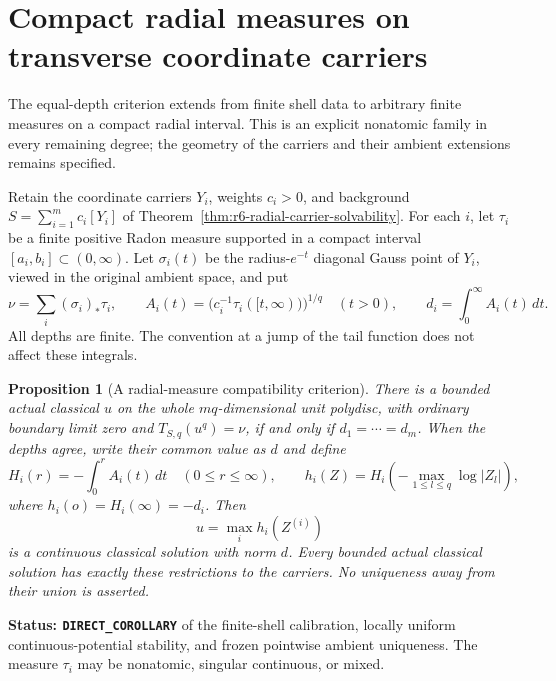 \documentclass[11pt,a4paper]{article}
\numberwithin{equation}{section}
\newtheorem{proposition}[theorem]{Proposition}
\theoremstyle{definition}
\theoremstyle{remark}
\begin{document}
\section{Compact radial measures on transverse coordinate carriers}
\label{sec:r6-radial-measure-carriers}

The equal-depth criterion extends from finite shell data to arbitrary
finite measures on a compact radial interval. This is an explicit
nonatomic family in every remaining degree; the geometry of the
carriers and their ambient extensions remains specified.

Retain the coordinate carriers $Y_i$, weights $c_i>0$, and background
$S=\sum_{i=1}^m c_i[Y_i]$ of
Theorem~\ref{thm:r6-radial-carrier-solvability}. For each $i$, let
$\tau_i$ be a finite positive Radon measure supported in a compact
interval $[a_i,b_i]\subset(0,\infty)$. Let
$\sigma_i(t)$ be the radius-$e^{-t}$ diagonal Gauss point of $Y_i$,
viewed in the original ambient space, and put
\[
 \nu=\sum_i(\sigma_i)_*\tau_i,\qquad
 A_i(t)=\bigl(c_i^{-1}\tau_i([t,\infty))\bigr)^{1/q}
       \quad(t>0),\qquad
 d_i=\int_0^\infty A_i(t)\,dt.
\]
All depths are finite. The convention at a jump of the tail function
does not affect these integrals.

\begin{proposition}[A radial-measure compatibility criterion]
\label{prop:r6-radial-measure-carrier-solvability}
There is a bounded actual classical $u$ on the whole $mq$-dimensional
unit polydisc, with ordinary boundary limit zero and
$T_{S,q}(u^q)=\nu$, if and only if $d_1=\cdots=d_m$.
When the depths agree, write their common value as $d$ and define
\[
 H_i(r)=-\int_0^r A_i(t)\,dt\quad(0\le r\le\infty),\qquad
 h_i(Z)=H_i\left(-\max_{1\le l\le q}\log|Z_l|\right),
\]
where $h_i(o)=H_i(\infty)=-d_i$. Then
\[
                    u=\max_i h_i(Z^{(i)})
\]
is a continuous classical solution with norm $d$. Every bounded
actual classical solution has exactly these restrictions to the
carriers. No uniqueness away from their union is asserted.
\end{proposition}

\noindent\textbf{Status: \texttt{DIRECT\_COROLLARY}} of the
finite-shell calibration, locally uniform continuous-potential
stability, and frozen pointwise ambient uniqueness. The measure
$\tau_i$ may be nonatomic, singular continuous, or mixed.
\end{document}
